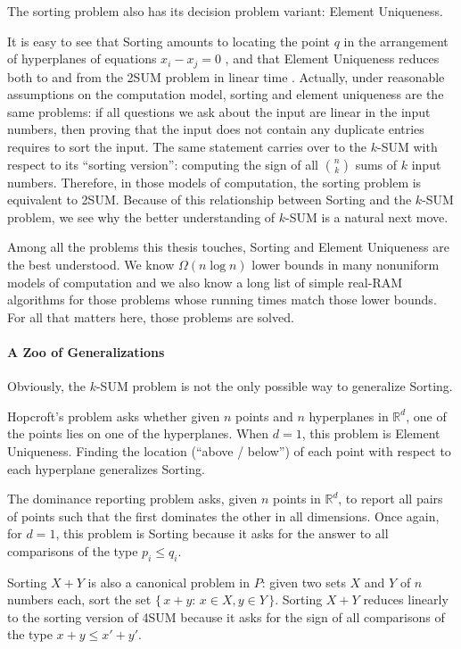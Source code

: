 The sorting problem also has its decision problem variant: Element Uniqueness.
%


It is easy to see
that Sorting amounts to locating the point \(q\) in
the arrangement of hyperplanes of equations \(x_i - x_j = 0\)%
, and
that Element Uniqueness reduces both to and from the 2SUM
problem in linear time%
.
%
Actually, under reasonable assumptions on the computation model, sorting and
element uniqueness are the same problems: if all questions we ask about the
input are linear in the input numbers, then proving that the input
does not contain any duplicate entries requires to sort the input.
%
The same statement carries over to the \(k\)-SUM with respect to its ``sorting
version'': computing the sign of all \(n \choose k\) sums of \(k\) input
numbers.
%
Therefore, in those models of computation, the sorting problem is equivalent to
2SUM.
%
Because of this relationship between Sorting and the \(k\)-SUM problem,
we see why the better understanding of \(k\)-SUM is a natural next move.

Among all the problems this thesis touches, Sorting and Element Uniqueness
are the best understood. We know \(\Omega(n \log n)\) lower bounds in many
nonuniform models of computation and we also know a long list of simple
real-RAM algorithms for those problems whose running times match those lower
bounds. For all that matters here, those problems are solved.


\paragraph{A Zoo of Generalizations}
Obviously, the \(k\)-SUM problem is not the only possible way to generalize
Sorting.

Hopcroft's problem asks whether given \(n\) points and \(n\) hyperplanes in
\(\mathbb{R}^d\), one of the points lies on one of the hyperplanes. When
\(d=1\), this problem is Element Uniqueness. Finding the location (``above /
below'') of each point
with respect to each hyperplane generalizes Sorting.

The dominance reporting problem asks, given \(n\) points in \(\mathbb{R}^d\),
to report all pairs of points such that the first dominates the other in all
dimensions. Once again, for \(d=1\), this problem is Sorting because it asks
for the answer to all comparisons of the type \(p_i \leq q_i\).

Sorting \(X+Y\) is also a canonical problem in \(P\): given two sets
\(X\) and \( Y \) of \( n \) numbers each, sort the set \( \{\, x + y \colon\,
x \in X, y \in Y\,\} \). Sorting \(X+Y\) reduces linearly to the sorting
version of 4SUM because it asks for the sign of all comparisons of the type
\(x+y \leq x'+y'\).

